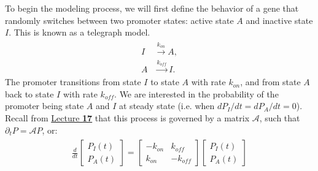 \documentclass[11pt]{exam}
\begin{document}
\begin{questions}
To begin the modeling process, we will first define the behavior of a gene that randomly switches between two promoter states: active state $A$ and inactive state $I$. This is known as a telegraph model.
\begin{align}\label{eq:tele}
    \begin{split}
        I &\xrightarrow{k_{on}} A,\\
        A &\xrightarrow{k_{off}} I.
    \end{split}
\end{align}
The promoter transitions from state $I$ to state $A$ with rate $k_{on}$, and from state $A$ back to state $I$ with rate $k_{off}$. We are interested in the probability of the promoter being state $A$ and $I$ at steady state (i.e. when $dP_I/dt = dP_A/dt=0$). Recall from \href{https://docs.google.com/presentation/d/1Nf528xSOGWQS6sEkkAdA1MSt4p7u3aHnttA-tXGlzP0/edit#slide=id.g114859ac4d2_0_156}{Lecture \textbf{17}} that this process is governed by a matrix $\mathcal{A}$, such that $\partial_t P = \mathcal{A}P$, or:
\begin{align}\label{eq:cme_tele}
    \begin{split}
        \frac{d}{dt} \begin{bmatrix}P_I(t) \\ P_A(t)\end{bmatrix} = \begin{bmatrix} -k_{on} & k_{off} \\ k_{on} & -k_{off}\end{bmatrix} \begin{bmatrix}P_I(t) \\ P_A(t)\end{bmatrix}
    \end{split}
\end{align}

\end{questions}
\end{document}
